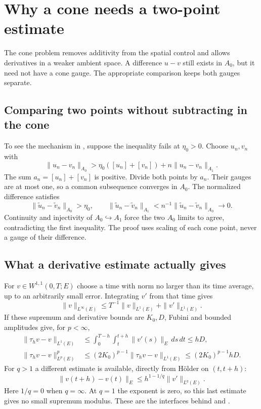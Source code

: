 \documentclass[12pt,reqno]{amsart}
\begin{document}
\section{Why a cone needs a two-point estimate}
The cone problem removes additivity from the spatial control and allows derivatives in a weaker ambient space. A difference $u-v$ still exists in $A_0$, but it need not have a cone gauge. The appropriate comparison keeps both gauges separate.
\subsection{Comparing two points without subtracting in the cone}
\begin{lemma}\label{lem:ehrling}

\end{lemma}
To see the mechanism in \cite[Lemma 1, pp.~4--5]{S-barrett-suli}, suppose the inequality fails at $\eta_0>0$. Choose $u_n,v_n$ with
\[
\|u_n-v_n\|_{A_0}>\eta_0([u_n]+[v_n])+n\|u_n-v_n\|_{A_1}.
\]
The sum $a_n=[u_n]+[v_n]$ is positive. Divide both points by $a_n$. Their gauges are at most one, so a common subsequence converges in $A_0$. The normalized difference satisfies
\[
\|\widetilde u_n-\widetilde v_n\|_{A_0}>\eta_0,
\qquad
\|\widetilde u_n-\widetilde v_n\|_{A_1}
< n^{-1}\|\widetilde u_n-\widetilde v_n\|_{A_0}\longrightarrow0.
\]
Continuity and injectivity of $A_0\hookrightarrow A_1$ force the two $A_0$ limits to agree, contradicting the first inequality. The proof uses scaling of each cone point, never a gauge of their difference.
\subsection{What a derivative estimate actually gives}
For $v\in W^{1,1}(0,T;E)$ choose a time with norm no larger than its time average, up to an arbitrarily small error. Integrating $v'$ from that time gives
\begin{equation}\label{eq:w11}
\|v\|_{L^\infty(E)}\le T^{-1}\|v\|_{L^1(E)}+\|v'\|_{L^1(E)}.
\end{equation}
If these supremum and derivative bounds are $K_0,D$, Fubini and bounded amplitudes give, for $p<\infty$,
\begin{align}
\|\tau_hv-v\|_{L^1(E)}
&\le\int_0^{T-h}\int_t^{t+h}\|v'(s)\|_E\,ds\,dt\le hD,\label{eq:l1shift}\\
\|\tau_hv-v\|_{L^p(E)}^p
&\le(2K_0)^{p-1}\|\tau_hv-v\|_{L^1(E)}
\le(2K_0)^{p-1}hD.\label{eq:pshift}
\end{align}
For $q>1$ a different estimate is available, directly from H\"older on $(t,t+h)$:
\begin{equation}\label{eq:supshift}
\|v(t+h)-v(t)\|_E\le h^{1-1/q}\|v'\|_{L^q(E)}.
\end{equation}
Here $1/q=0$ when $q=\infty$. At $q=1$ the exponent is zero, so this last estimate gives no small supremum modulus. These are the interfaces behind \cite[Lemma 4, pp.~77--78]{S-simon} and \cite[Corollary 2.4, p.~1730]{S-maitre}.
\end{document}
